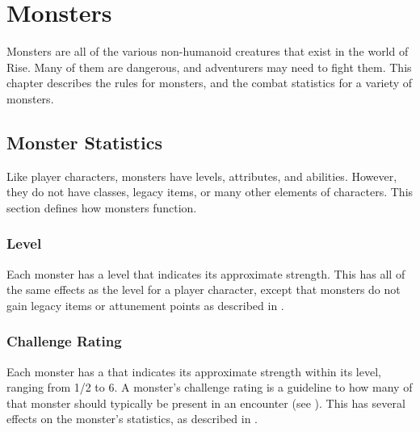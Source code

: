 \chapter{Monsters}

Monsters are all of the various non-humanoid creatures that exist in the world of Rise.
Many of them are dangerous, and adventurers may need to fight them.
This chapter describes the rules for monsters, and the combat statistics for a variety of monsters.

\section{Monster Statistics}
    Like player characters, monsters have levels, attributes, and abilities.
    However, they do not have classes, legacy items, or many other elements of characters.
    This section defines how monsters function.

    \subsection{Level}
        Each monster has a level that indicates its approximate strength.
        This has all of the same effects as the level for a player character, except that monsters do not gain legacy items or attunement points as described in .

    \subsection{Challenge Rating}\label{Challenge Rating}
        Each monster has a  that indicates its approximate strength within its level, ranging from 1/2 to 6.
        A monster's challenge rating is a guideline to how many of that monster should typically be present in an encounter (see ).
        This has several effects on the monster's statistics, as described in .

